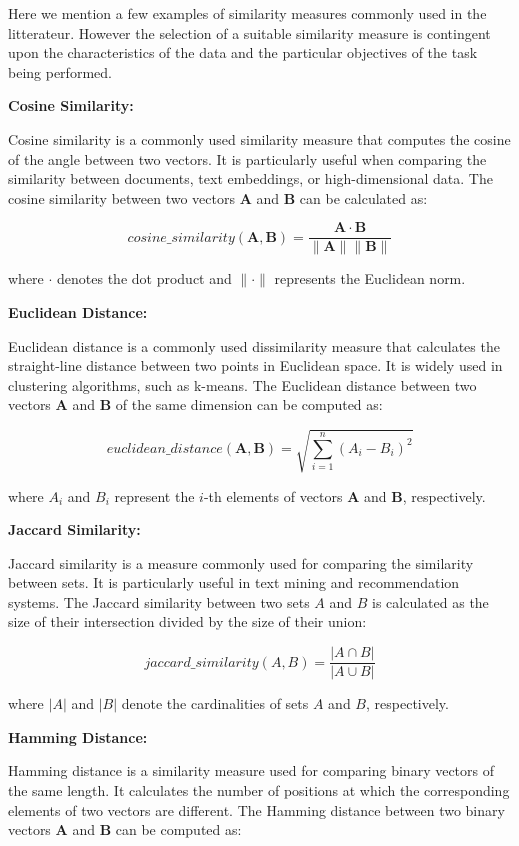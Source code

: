 \documentclass[a4paper,12pt]{article}
\begin{document}
Here we mention a few examples of similarity measures commonly used in the litterateur. However the selection of a suitable similarity measure is contingent upon the characteristics of the data and the particular objectives of the task being performed.


\textbf{Cosine Similarity:}

Cosine similarity is a commonly used similarity measure that computes the cosine of the angle between two vectors. It is particularly useful when comparing the similarity between documents, text embeddings, or high-dimensional data. The cosine similarity between two vectors $\mathbf{A}$ and $\mathbf{B}$ can be calculated as:

$$cosine\_similarity(\mathbf{A}, \mathbf{B}) = \frac{\mathbf{A} \cdot \mathbf{B}}{\|\mathbf{A}\| \|\mathbf{B}\|}$$

where $\cdot$ denotes the dot product and $\|\cdot\|$ represents the Euclidean norm.

\textbf{Euclidean Distance:}

Euclidean distance is a commonly used dissimilarity measure that calculates the straight-line distance between two points in Euclidean space. It is widely used in clustering algorithms, such as k-means. The Euclidean distance between two vectors $\mathbf{A}$ and $\mathbf{B}$ of the same dimension can be computed as:

$$
euclidean\_distance(\mathbf{A}, \mathbf{B}) = \sqrt{\sum_{i=1}^{n} (A_i - B_i)^2}
$$

where $A_i$ and $B_i$ represent the $i$-th elements of vectors $\mathbf{A}$ and $\mathbf{B}$, respectively.

\textbf{Jaccard Similarity:}

Jaccard similarity \cite{jaccard} is a measure commonly used for comparing the similarity between sets. It is particularly useful in text mining and recommendation systems. The Jaccard similarity between two sets $A$ and $B$ is calculated as the size of their intersection divided by the size of their union:

$$
jaccard\_similarity(A, B) = \frac{|A \cap B|}{|A \cup B|}
$$

where $|A|$ and $|B|$ denote the cardinalities of sets $A$ and $B$, respectively.

\textbf{Hamming Distance:}

Hamming distance \cite{hamming} is a similarity measure used for comparing binary vectors of the same length. It calculates the number of positions at which the corresponding elements of two vectors are different. The Hamming distance between two binary vectors $\mathbf{A}$ and $\mathbf{B}$ can be computed as:
\end{document}
